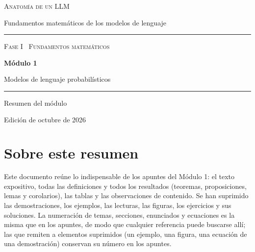 \documentclass[11pt,a4paper,twoside,openany]{book}
\begin{document}
\frontmatter
\begin{titlepage}
\centering
\vspace*{2.5cm}
{\large\scshape Anatomía de un LLM}\par
\vspace{0.4cm}
{\normalsize Fundamentos matemáticos de los modelos de lenguaje}\par
\vspace{2.2cm}
\rule{\textwidth}{0.8pt}\par\vspace{0.5cm}
{\small\scshape Fase I \textperiodcentered\ Fundamentos matemáticos}\par\vspace{0.3cm}
{\Huge\bfseries Módulo 1\par}\vspace{0.3cm}
{\LARGE Modelos de lenguaje probabilísticos\par}
\vspace{0.5cm}\rule{\textwidth}{0.4pt}\par
\vspace{1.6cm}
{\large Resumen del módulo}\par
\vfill
{\small Edición de octubre de 2026}\par
\end{titlepage}

\chapter*{Sobre este resumen}

Este documento reúne lo indispensable de los apuntes del Módulo 1: el texto expositivo, todas las definiciones y todos los resultados (teoremas, proposiciones, lemas y corolarios), las tablas y las observaciones de contenido. Se han suprimido las demostraciones, los ejemplos, las lecturas, las figuras, los ejercicios y sus soluciones. La numeración de temas, secciones, enunciados y ecuaciones es la misma que en los apuntes, de modo que cualquier referencia puede buscarse allí; las que remiten a elementos suprimidos (un ejemplo, una figura, una ecuación de una demostración) conservan su número en los apuntes.
\end{document}
